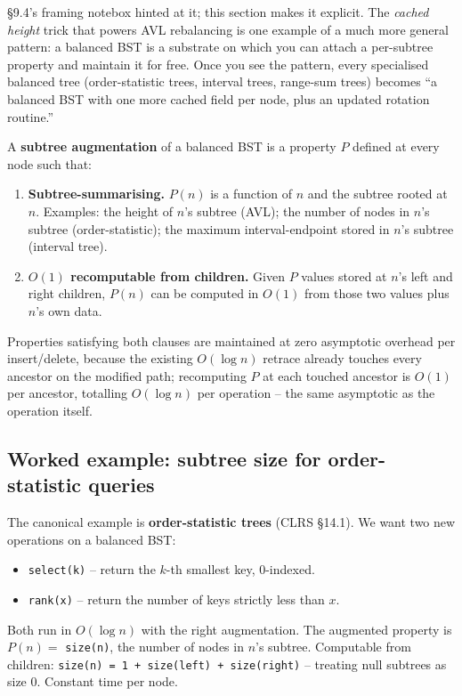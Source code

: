 \documentclass[11pt]{article}
\begin{document}
\S9.4's framing notebox hinted at it; this section makes it
explicit. The \emph{cached height} trick that powers AVL
rebalancing is one example of a much more general pattern: a
balanced BST is a substrate on which you can attach a per-subtree
property and maintain it for free. Once you see the pattern, every
specialised balanced tree (order-statistic trees, interval trees,
range-sum trees) becomes ``a balanced BST with one more cached
field per node, plus an updated rotation routine.''

\begin{defnbox}
A \textbf{subtree augmentation} of a balanced BST is a property
$P$ defined at every node such that:
\begin{enumerate}[leftmargin=*]
    \item \textbf{Subtree-summarising.} $P(n)$ is a function of $n$
          and the subtree rooted at $n$. Examples: the height of
          $n$'s subtree (AVL); the number of nodes in $n$'s
          subtree (order-statistic); the maximum interval-endpoint
          stored in $n$'s subtree (interval tree).
    \item \textbf{$O(1)$ recomputable from children.} Given $P$
          values stored at $n$'s left and right children, $P(n)$
          can be computed in $O(1)$ from those two values plus
          $n$'s own data.
\end{enumerate}
Properties satisfying both clauses are maintained at zero
asymptotic overhead per insert/delete, because the existing
$O(\log n)$ retrace already touches every ancestor on the modified
path; recomputing $P$ at each touched ancestor is $O(1)$ per
ancestor, totalling $O(\log n)$ per operation -- the same
asymptotic as the operation itself.
\end{defnbox}

\subsection*{Worked example: subtree size for order-statistic queries}

The canonical example is \textbf{order-statistic trees} (CLRS
\S14.1). We want two new operations on a balanced BST:
\begin{itemize}[leftmargin=*]
    \item \texttt{select(k)} -- return the $k$-th smallest key,
          $0$-indexed.
    \item \texttt{rank(x)} -- return the number of keys strictly
          less than $x$.
\end{itemize}
Both run in $O(\log n)$ with the right augmentation. The augmented
property is $P(n) = $ \texttt{size(n)}, the number of nodes in
$n$'s subtree. Computable from children: \texttt{size(n) = 1
+ size(left) + size(right)} -- treating null subtrees as size
$0$. Constant time per node.
\end{document}
